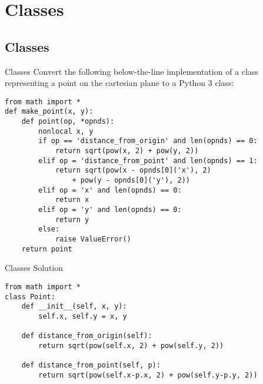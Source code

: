 \documentclass[9pt]{beamer}
\begin{document}
\section{Classes}
\subsection{Classes}

\begin{frame}[fragile]{Classes}
  Convert the following below-the-line implementation of a class
  representing a point on the cartesian plane to a Python 3 class:

  \begin{lstlisting}[basicstyle=\small]
from math import *
def make_point(x, y):
    def point(op, *opnds):
        nonlocal x, y
        if op == 'distance_from_origin' and len(opnds) == 0:
            return sqrt(pow(x, 2) + pow(y, 2))
        elif op = 'distance_from_point' and len(opnds) == 1:
            return sqrt(pow(x - opnds[0]('x'), 2)
                + pow(y - opnds[0]('y'), 2))
        elif op = 'x' and len(opnds) == 0:
            return x
        elif op = 'y' and len(opnds) == 0:
            return y
        else:
            raise ValueError()
    return point
  \end{lstlisting}
\end{frame}

\begin{frame}[fragile]{Classes}
  Solution

  \begin{lstlisting}[basicstyle=\small]
from math import *
class Point:
    def __init__(self, x, y):
        self.x, self.y = x, y

    def distance_from_origin(self):
        return sqrt(pow(self.x, 2) + pow(self.y, 2))

    def distance_from_point(self, p):
        return sqrt(pow(self.x-p.x, 2) + pow(self.y-p.y, 2))
  \end{lstlisting}
\end{frame}
\end{document}
